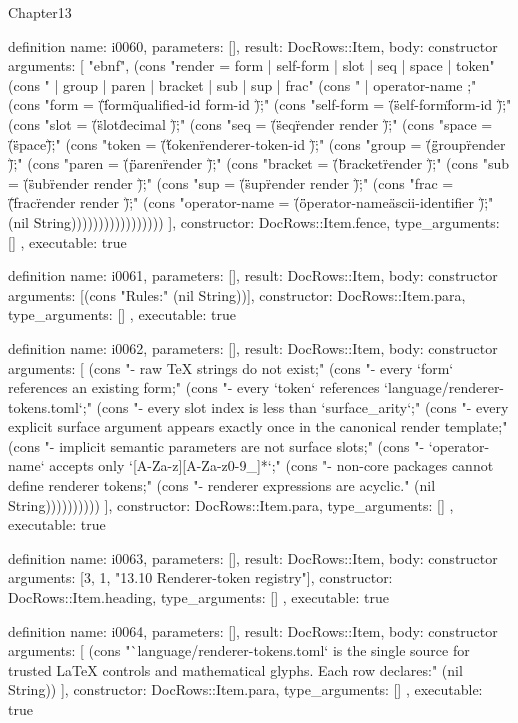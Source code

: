 \begin{lexlean}{Chapter13}
\begin{semanticmodule}
definition{
  name: i0060,
  parameters: [],
  result: DocRows::Item,
  body: constructor{
    arguments: [
      "ebnf",
      (cons "render      = form | self-form | slot | seq | space | token" (cons "            | group | paren | bracket | sub | sup | frac" (cons "            | operator-name ;" (cons "form        = \"(\" \"form\" qualified-id form-id \")\" ;" (cons "self-form   = \"(\" \"self-form\" form-id \")\" ;" (cons "slot        = \"(\" \"slot\" decimal \")\" ;" (cons "seq         = \"(\" \"seq\" render {render} \")\" ;" (cons "space       = \"(\" \"space\" \")\" ;" (cons "token       = \"(\" \"token\" renderer-token-id \")\" ;" (cons "group       = \"(\" \"group\" render \")\" ;" (cons "paren       = \"(\" \"paren\" render \")\" ;" (cons "bracket     = \"(\" \"bracket\" render \")\" ;" (cons "sub         = \"(\" \"sub\" render render \")\" ;" (cons "sup         = \"(\" \"sup\" render render \")\" ;" (cons "frac        = \"(\" \"frac\" render render \")\" ;" (cons "operator-name = \"(\" \"operator-name\" ascii-identifier \")\" ;" (nil String)))))))))))))))))
    ],
    constructor: DocRows::Item.fence,
    type_arguments: []
  },
  executable: true
}

definition{
  name: i0061,
  parameters: [],
  result: DocRows::Item,
  body: constructor{
    arguments: [(cons "Rules:" (nil String))],
    constructor: DocRows::Item.para,
    type_arguments: []
  },
  executable: true
}

definition{
  name: i0062,
  parameters: [],
  result: DocRows::Item,
  body: constructor{
    arguments: [
      (cons "- raw TeX strings do not exist;" (cons "- every `form` references an existing form;" (cons "- every `token` references `language/renderer-tokens.toml`;" (cons "- every slot index is less than `surface_arity`;" (cons "- every explicit surface argument appears exactly once in the canonical render template;" (cons "- implicit semantic parameters are not surface slots;" (cons "- `operator-name` accepts only `[A-Za-z][A-Za-z0-9_]*`;" (cons "- non-core packages cannot define renderer tokens;" (cons "- renderer expressions are acyclic." (nil String))))))))))
    ],
    constructor: DocRows::Item.para,
    type_arguments: []
  },
  executable: true
}

definition{
  name: i0063,
  parameters: [],
  result: DocRows::Item,
  body: constructor{
    arguments: [3, 1, "13.10 Renderer-token registry"],
    constructor: DocRows::Item.heading,
    type_arguments: []
  },
  executable: true
}

definition{
  name: i0064,
  parameters: [],
  result: DocRows::Item,
  body: constructor{
    arguments: [
      (cons "`language/renderer-tokens.toml` is the single source for trusted LaTeX controls and mathematical glyphs. Each row declares:" (nil String))
    ],
    constructor: DocRows::Item.para,
    type_arguments: []
  },
  executable: true
}


\end{semanticmodule}
\end{lexlean}
